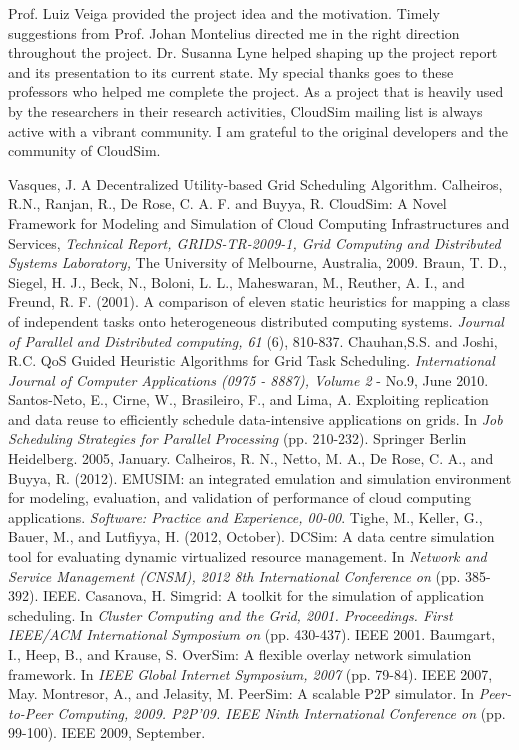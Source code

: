 \documentclass[times, 10pt,twocolumn]{article}
\begin{document}
Prof. Luiz Veiga provided the project idea and the motivation. Timely suggestions from Prof. Johan Montelius directed me in the right direction throughout the project. Dr. Susanna Lyne helped shaping up the project report and its presentation to its current state. My special thanks goes to these professors who helped me complete the project. As a project that is heavily used by the researchers in their research activities, CloudSim mailing list is always active with a vibrant community. I am grateful to the original developers and the community of CloudSim.

\begin{thebibliography}{1}

 Vasques, J. A Decentralized Utility-based Grid Scheduling Algorithm.
 Calheiros, R.N., Ranjan, R., De Rose, C. A. F. and Buyya, R. CloudSim: A Novel Framework for Modeling and
 Simulation of Cloud Computing Infrastructures and Services, {\em Technical Report, GRIDS-TR-2009-1, Grid
 Computing and Distributed Systems Laboratory,} The University of Melbourne, Australia, 2009.
 Braun, T. D., Siegel, H. J., Beck, N., Boloni, L. L., Maheswaran, M., Reuther, A. I., and Freund, R. F. (2001). A comparison of eleven static heuristics for mapping a class of independent tasks onto heterogeneous distributed computing systems. {\em Journal of Parallel and Distributed computing, 61} (6), 810-837.
 Chauhan,S.S. and Joshi, R.C. QoS Guided Heuristic Algorithms for Grid Task Scheduling. {\em International Journal of Computer Applications (0975 - 8887), Volume 2} - No.9, June 2010.
 Santos-Neto, E., Cirne, W., Brasileiro, F., and Lima, A. Exploiting replication and data reuse to efficiently schedule data-intensive applications on grids. In {\em Job Scheduling Strategies for Parallel Processing} (pp. 210-232). Springer Berlin Heidelberg. 2005, January.
 Calheiros, R. N., Netto, M. A., De Rose, C. A., and Buyya, R. (2012). EMUSIM: an integrated emulation and simulation environment for modeling, evaluation, and validation of performance of cloud computing applications. {\em Software: Practice and Experience, 00-00}.
 Tighe, M., Keller, G., Bauer, M., and Lutfiyya, H. (2012, October). DCSim: A data centre simulation tool for evaluating dynamic virtualized resource management. In {\em Network and Service Management (CNSM), 2012 8th International Conference on} (pp. 385-392). IEEE.
Casanova, H. Simgrid: A toolkit for the simulation of application scheduling. In {\em Cluster Computing and the Grid, 2001. Proceedings. First IEEE/ACM International Symposium on} (pp. 430-437). IEEE 2001.
Baumgart, I., Heep, B., and Krause, S. OverSim: A flexible overlay network simulation framework. In {\em IEEE Global Internet Symposium, 2007} (pp. 79-84). IEEE 2007, May.
 Montresor, A., and Jelasity, M. PeerSim: A scalable P2P simulator. In {\em Peer-to-Peer Computing, 2009. P2P'09. IEEE Ninth International Conference on} (pp. 99-100). IEEE 2009, September.


\end{thebibliography}
\end{document}
